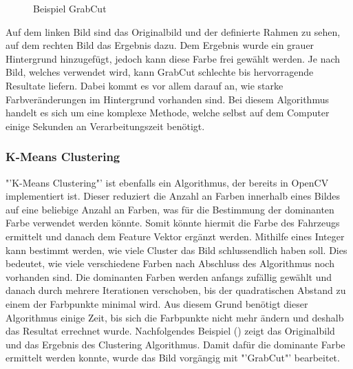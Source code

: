 {\begin{figure}[H]
  \centering
  \caption{Beispiel GrabCut}
  \label{bGrabCut}
\end{figure}

Auf dem linken Bild sind das Originalbild und der definierte Rahmen zu sehen, auf dem rechten Bild das Ergebnis dazu. Dem Ergebnis wurde ein grauer Hintergrund hinzugefügt, jedoch kann diese Farbe frei gewählt werden. Je nach Bild, welches verwendet wird, kann GrabCut schlechte bis hervorragende Resultate liefern. Dabei kommt es vor allem darauf an, wie starke Farbveränderungen im Hintergrund vorhanden sind. Bei diesem Algorithmus handelt es sich um eine komplexe Methode, welche selbst auf dem Computer einige Sekunden an Verarbeitungszeit benötigt. \cite{GrabCut}

\subsubsection{K-Means Clustering}
"'K-Means Clustering"' ist ebenfalls ein Algorithmus, der bereits in OpenCV implementiert ist. Dieser reduziert die Anzahl an Farben innerhalb eines Bildes auf eine beliebige Anzahl an Farben, was für die Bestimmung der dominanten Farbe verwendet werden könnte. Somit könnte hiermit die Farbe des Fahrzeugs ermittelt und danach dem Feature Vektor ergänzt werden. Mithilfe eines Integer kann bestimmt werden, wie viele Cluster das Bild schlussendlich haben soll. Dies bedeutet, wie viele verschiedene Farben nach Abschluss des Algorithmus noch vorhanden sind. Die dominanten Farben werden anfangs zufällig gewählt und danach durch mehrere Iterationen verschoben, bis der quadratischen Abstand zu einem der Farbpunkte minimal wird. Aus diesem Grund benötigt dieser Algorithmus einige Zeit, bis sich die Farbpunkte nicht mehr ändern und deshalb das Resultat errechnet wurde. Nachfolgendes Beispiel () zeigt das Originalbild und das Ergebnis des Clustering Algorithmus. Damit dafür die dominante Farbe ermittelt werden konnte, wurde das Bild vorgängig mit "'GrabCut"' bearbeitet.

}
